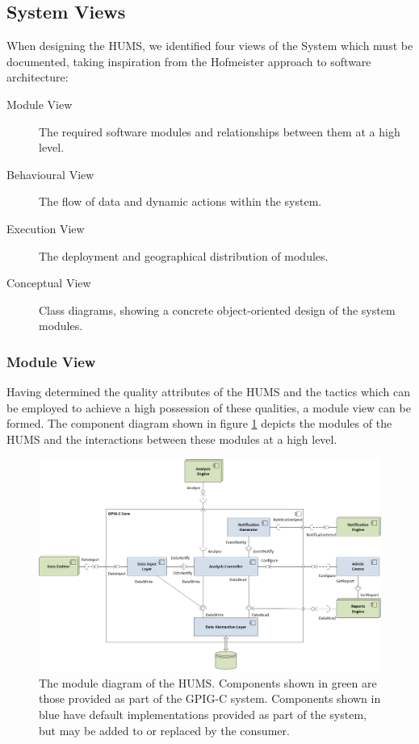 \documentclass[10pt,a4paper]{article}
\begin{document}
\subsection{System Views}
\label{sec:architecture-views}

When designing the HUMS, we identified four views of the System which must be
documented, taking inspiration from the Hofmeister\cite{hof1999} approach to
software architecture:

\begin{description}
  \item[Module View] The required software modules and relationships
    between them at a high level.

  \item[Behavioural View] The flow of data and dynamic actions within
    the system.

  \item[Execution View] The deployment and geographical distribution of modules.

  \item[Conceptual View] Class diagrams, showing a concrete object-oriented
    design of the system modules.
\end{description}

\subsubsection{Module View}
\label{sec:architecture-moduleview}

Having determined the quality attributes of the HUMS and the tactics
which can be employed to achieve a high possession of these
qualities, a module view can be formed. The component diagram
shown in figure \ref{fig:ComponentDiagram} depicts the modules of the
HUMS and the interactions between these modules at a high level.

\begin{figure}[!ht]
  \centering
  \includegraphics[width=14cm]{images/ComponentDiagram.png}
  \caption{The module diagram of the HUMS. Components shown in green are those provided as part of the GPIG-C system. Components shown in blue have default implementations provided as part of the system, but may be added to or replaced by the consumer.}
  \label{fig:ComponentDiagram}
\end{figure}
\end{document}
